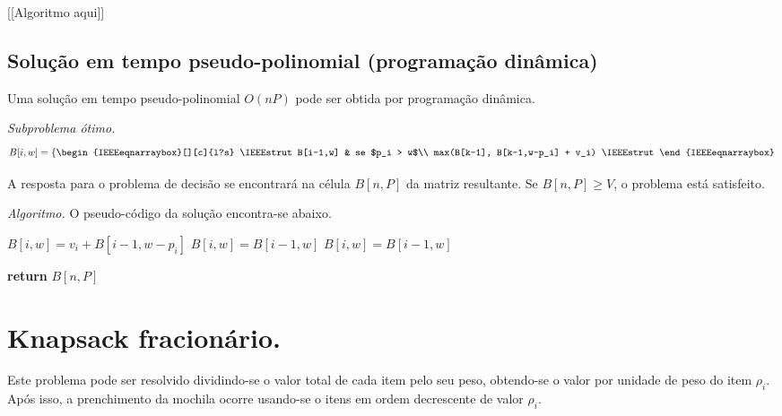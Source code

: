 \documentclass[a4paper]{article}
\begin{document}
[[Algoritmo aqui]]

\subsection*{Solução em tempo pseudo-polinomial (programação dinâmica)}
Uma solução em tempo pseudo-polinomial $O(nP)$ pode ser obtida por programação dinâmica.

{\it Subproblema ótimo.}
\[
B[i,w] = \left\{
\begin{IEEEeqnarraybox}[][c]{l?s}
\IEEEstrut
B[i-1,w] & se $p_i > w$\\
max(B[k-1], B[k-1,w-p_i] + v_i)
\IEEEstrut
\end{IEEEeqnarraybox}
\right.
\]

A resposta para o problema de decisão se encontrará na célula $B[n,P]$ da matriz resultante. Se $B[n,P] \ge V$, o problema está satisfeito.

{\it Algoritmo.} O pseudo-código da solução encontra-se abaixo.
\begin{algorithmic}
    \STATE $B[i,w] = v_i + B[i-1,w-p_i]$
   \ELSE
    \STATE $B[i,w] = B[i-1,w]$
   \ENDIF
  \ELSE 
   \STATE $B[i,w] = B[i-1,w]$
  \ENDIF
 \ENDFOR
\ENDFOR

{\bf return} $B[n,P]$
\end{algorithmic}

\section*{Knapsack fracionário.}
Este problema pode ser resolvido dividindo-se o valor total de cada item pelo seu peso, obtendo-se o valor por unidade de peso do item $\rho_i$. Após isso, a prenchimento da mochila ocorre usando-se o itens em ordem decrescente de valor $\rho_i$.
\end{document}
